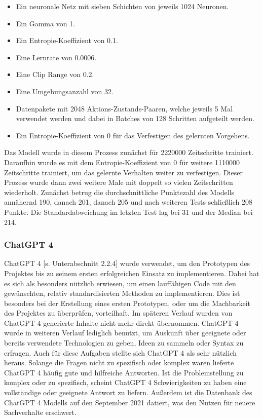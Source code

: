 \begin{itemize} 
\item Ein neuronale Netz mit sieben Schichten von jeweils 1024 Neuronen. 

\item Ein Gamma von 1. 

\item Ein Entropie-Koeffizient von 0.1. 

\item Eine Lernrate von 0.0006. 

\item Eine Clip Range von 0.2. 

\item Eine Umgebungsanzahl von 32. 

\item Datenpakete mit 2048 Aktions-Zustands-Paaren, welche jeweils 5 Mal verwendet werden und dabei in Batches von 128 Schritten aufgeteilt werden. 

\item Ein Entropie-Koeffizient von 0 für das Verfestigen des gelernten Vorgehens. 
\end{itemize} 

Das Modell wurde in diesem Prozess zunächst für 2220000 Zeitschritte trainiert. Daraufhin wurde es mit dem Entropie-Koeffizient von 0 für weitere 1110000 Zeitschritte trainiert, um das gelernte Verhalten weiter zu verfestigen. Dieser Prozess wurde dann zwei weitere Male mit doppelt so vielen Zeitschritten wiederholt. Zunächst betrug die durchschnittliche Punktezahl des Modells annähernd 190, danach 201, danach 205 und nach weiteren Tests schließlich 208 Punkte. Die Standardabweichung im letzten Test lag bei 31 und der Median bei 214.


\subsubsection{ChatGPT 4}
ChatGPT 4 [s. Unterabschnitt 2.2.4] wurde verwendet, um den Prototypen des Projektes bis zu seinem ersten erfolgreichen Einsatz zu implementieren. Dabei hat es sich als besonders nützlich erwiesen, um einen lauffähigen Code mit den gewünschten, relativ standardisierten Methoden zu implementieren. Dies ist besonders bei der Erstellung eines ersten Prototypen, oder um die Machbarkeit des Projektes zu überprüfen, vorteilhaft. Im späteren Verlauf wurden von ChatGPT 4 generierte Inhalte nicht mehr direkt übernommen. ChatGPT 4 wurde in weiteren Verlauf lediglich benutzt, um Auskunft über geeignete oder bereits verwendete Technologien zu geben, Ideen zu sammeln oder Syntax zu erfragen. Auch für diese Aufgaben stellte sich ChatGPT 4 als sehr nützlich heraus. Solange die Fragen nicht zu spezifisch oder komplex waren lieferte ChatGPT 4 häufig gute und hilfreiche Antworten. Ist die Problemstellung zu komplex oder zu spezifisch, scheint ChatGPT 4 Schwierigkeiten zu haben eine vollständige oder geeignete Antwort zu liefern. Außerdem ist die Datenbank des ChatGPT 4 Modells auf den September 2021 datiert, was den Nutzen für neuere Sachverhalte erschwert.